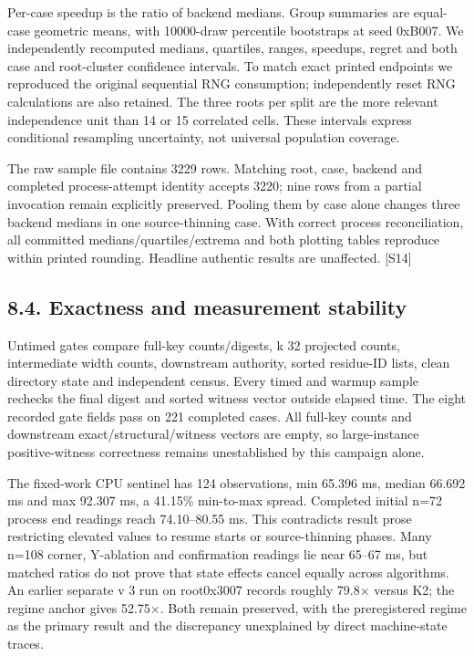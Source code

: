 \documentclass[10pt,letterpaper]{article}
\begin{document}
Per-case speedup is the ratio of backend medians. Group summaries are equal-case geometric means, with 10000-draw percentile bootstraps at seed 0xB007. We independently recomputed medians, quartiles, ranges, speedups, regret and both case and root-cluster confidence intervals. To match exact printed endpoints we reproduced the original sequential RNG consumption; independently reset RNG calculations are also retained. The three roots per split are the more relevant independence unit than 14 or 15 correlated cells. These intervals express conditional resampling uncertainty, not universal population coverage.


The raw sample file contains 3229 rows. Matching root, case, backend and completed process-attempt identity accepts 3220; nine rows from a partial invocation remain explicitly preserved. Pooling them by case alone changes three backend medians in one source-thinning case. With correct process reconciliation, all committed medians/quartiles/extrema and both plotting tables reproduce within printed rounding. Headline authentic results are unaffected. [S14]


\subsection*{8.4. Exactness and measurement stability}

Untimed gates compare full-key counts/digests, k 32 projected counts, intermediate width counts, downstream authority, sorted residue-ID lists, clean directory state and independent census. Every timed and warmup sample rechecks the final digest and sorted witness vector outside elapsed time. The eight recorded gate fields pass on 221 completed cases. All full-key counts and downstream exact/structural/witness vectors are empty, so large-instance positive-witness correctness remains unestablished by this campaign alone.


The fixed-work CPU sentinel has 124 observations, min 65.396 ms, median 66.692 ms and max 92.307 ms, a 41.15\% min-to-max spread. Completed initial n=72 process end readings reach 74.10--80.55 ms. This contradicts result prose restricting elevated values to resume starts or source-thinning phases. Many n=108 corner, Y-ablation and confirmation readings lie near 65--67 ms, but matched ratios do not prove that state effects cancel equally across algorithms. An earlier separate v 3 run on root0x3007 records roughly 79.8\ensuremath{\times} versus K2; the regime anchor gives 52.75\ensuremath{\times}. Both remain preserved, with the preregistered regime as the primary result and the discrepancy unexplained by direct machine-state traces.
\end{document}
